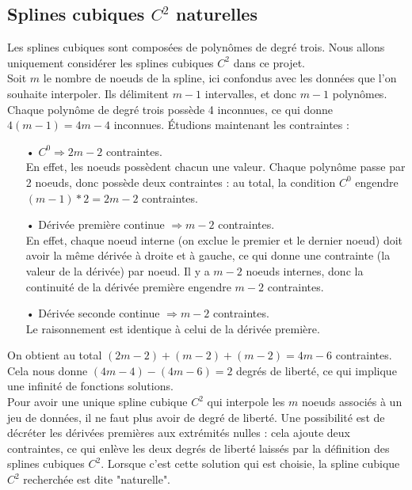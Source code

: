 \documentclass[a4paper,12pt]{article} %
\begin{document}
		\subsection{Splines cubiques $C^2$ naturelles}

            Les splines cubiques sont composées de polynômes de degré trois. Nous allons uniquement considérer les splines cubiques $C^2$ dans ce projet. \\
            
            Soit $m$ le nombre de noeuds de la spline, ici confondus avec les données que l'on souhaite interpoler. Ils délimitent $m-1$ intervalles, et donc $m-1$ polynômes. Chaque polynôme de degré trois possède 4 inconnues, ce qui donne $4(m-1) = 4m - 4$ inconnues. Étudions maintenant les contraintes : 
            \begin{itemize}
                \item[•] $C^0 \Rightarrow 2m-2$ contraintes.\\ 
                En effet, les noeuds possèdent chacun une valeur. Chaque polynôme passe par 2 noeuds, donc possède deux contraintes : au total, la condition $C^0$ engendre $(m-1)*2 = 2m-2$ contraintes. 
                \item[•] Dérivée première continue $\Rightarrow m-2$ contraintes. \\
                En effet, chaque noeud interne (on exclue le premier et le dernier noeud) doit avoir la même dérivée à droite et à gauche, ce qui donne une contrainte (la valeur de la dérivée) par noeud. Il y a $m-2$ noeuds internes, donc la continuité de la dérivée première engendre $m-2$ contraintes.
                \item[•] Dérivée seconde continue $\Rightarrow m-2$ contraintes. \\
                Le raisonnement est identique à celui de la dérivée première.
            \end{itemize}
            On obtient au total $(2m-2) + (m-2) + (m-2) = 4m-6$ contraintes. Cela nous donne $(4m-4) - (4m-6) = 2$ degrés de liberté, ce qui implique une infinité de fonctions solutions.\\
            
            Pour avoir une unique spline cubique $C^2$ qui interpole les $m$ noeuds associés à un jeu de données, il ne faut plus avoir de degré de liberté. Une possibilité est de décréter les dérivées premières aux extrémités nulles : cela ajoute deux contraintes, ce qui enlève les deux degrés de liberté laissés par la définition des splines cubiques $C^2$. Lorsque c'est cette solution qui est choisie, la spline cubique $C^2$ recherchée est dite "naturelle".
            
\end{document}
